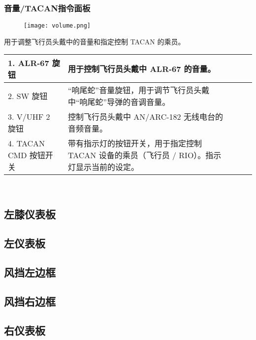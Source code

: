 \subsubsection{音量/TACAN指令面板}

\begin{figure}[h]
  \center
  \texttt{[image: volume.png]}
\end{figure}
用于调整飞行员头戴中的音量和指定控制 TACAN 的乘员。

\begin{table}[htbp]
  \centering
  \begin{minipage}[t]{0.8\textwidth}
    \begin{tabularx}{\linewidth}{|l|X|X|X|X|}
      \hline
      1. ALR-67 旋钮 & 用于控制飞行员头戴中 ALR-67 的音量。\\
      \hline
      2. SW 旋钮 & “响尾蛇”音量旋钮，用于调节飞行员头戴中“响尾蛇”导弹的音调音量。\\
      \hline
      3. V/UHF 2 旋钮 & 控制飞行员头戴中 AN/ARC-182 无线电台的音频音量。\\
      \hline
      4. TACAN CMD 按钮开关 & 带有指示灯的按钮开关，用于指定控制 TACAN 设备的乘员（飞行员 / RIO）。指示灯显示当前的设定。\\
      \hline
    \end{tabularx}\\[2pt]
  \end{minipage}
\end{table}

\subsection{左膝仪表板}

\subsection{左仪表板}

\subsection{风挡左边框}

\subsection{风挡右边框}

\subsection{右仪表板}

